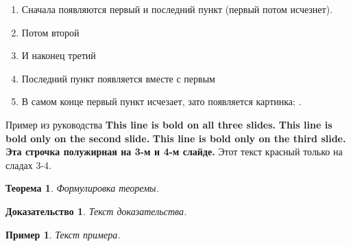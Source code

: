 \documentclass[t,pdf,hyperref={unicode}]{beamer} %
\newtheorem{rtheorem}{Теорема}
\newtheorem{rproof}{Доказательство}
\newtheorem{rexample}{Пример}
\begin{document}
\begin{frame}
    \begin{enumerate}
        \item<1-5> Сначала появляются первый и последний пункт (первый потом исчезнет).
        \item<2-> Потом второй
        \item<3-> И наконец третий
        \item<1-> Последний пункт появляется вместе с первым
    	\item<6-> В самом конце первый пункт исчезает, зато появляется картинка: \insertlogo.
    \end{enumerate}
\end{frame}

\begin{frame}{Пример из руководства}
   \textbf{This line is bold on all three slides.}
   \textbf<2>{This line is bold only on the second slide.}
   \textbf<3>{This line is bold only on the third slide.}
   \textbf<3,4>{Эта строчка полужирная на 3-м и 4-м слайде.}
	 Этот текст красный только на сладах 3-4.
\end{frame}

\begin{frame}
    \begin{rtheorem}
		Формулировка теоремы.    
	\end{rtheorem}
	\begin{rproof}
		Текст доказательства.
    \end{rproof}
	\begin{rexample}
		Текст примера.
	\end{rexample}
\end{frame}
\end{document}
